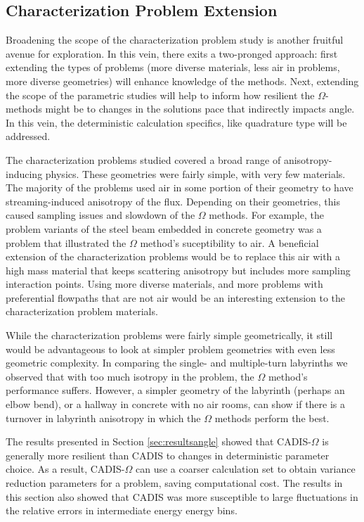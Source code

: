 \subsection{Characterization Problem Extension}
\label{subsec:extendcharprobs}

Broadening the scope
of the characterization problem study
is another fruitful avenue for exploration. In this
vein, there exits a two-pronged approach: first extending the types of problems
(more diverse materials, less air in problems, more diverse geometries) will
enhance knowledge of the methods. Next, extending the scope of the parametric
studies will help to inform how resilient the $\Omega$-methods might be to
changes in the solutions pace that indirectly impacts angle.
In this vein, the deterministic calculation specifics, like
quadrature type will be addressed.

The characterization problems studied covered a broad range of
anisotropy-inducing physics. These geometries were fairly simple, with very few
materials. The majority of the problems used air in some portion of their
geometry to have streaming-induced anisotropy of the flux. Depending on their
geometries, this caused sampling issues and slowdown of the $\Omega$ methods.
For example, the problem variants of the
steel beam embedded in concrete geometry was a
problem that illustrated the $\Omega$ method's suceptibility to air. A
beneficial extension of the characterization problems would be to replace this
air with a high mass material that keeps scattering anisotropy but includes more
sampling interaction points. Using more diverse materials, and more problems
with preferential flowpaths that are not air would be an interesting extension
to the characterization problem materials.

While the characterization problems were fairly simple geometrically, it still
would be advantageous to look at simpler problem geometries with even less
geometric complexity. In
comparing the single- and multiple-turn labyrinths we observed that with too
much isotropy in the problem, the $\Omega$ method's performance suffers.
However, a simpler
geometry of the labyrinth (perhaps an elbow bend), or a hallway in concrete with
no air rooms, can show if there is a turnover in labyrinth anisotropy in which
the $\Omega$ methods perform the best.

The results presented in Section \ref{sec:resultsangle} showed that
CADIS-$\Omega$ is generally more resilient than CADIS to changes in
deterministic parameter choice. As a result, CADIS-$\Omega$ can use a coarser
calculation set to obtain variance reduction parameters for a problem, saving
computational cost. The results in this section also showed that CADIS was more
susceptible to large fluctuations in the relative errors in intermediate energy
energy bins.

